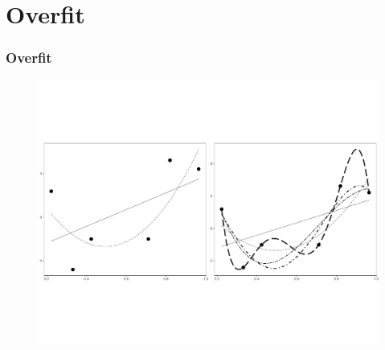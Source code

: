 \documentclass[
  shownotes,
  xcolor={svgnames},
  hyperref={colorlinks,citecolor=DarkBlue,linkcolor=DarkRed,urlcolor=DarkBlue}
  ]{beamer}
\begin{document}
\section{Overfit}
\begin{frame}[fragile]
\frametitle{Overfit}


        \begin{figure}[H] \centering
            \captionsetup{justification=centering}
              \includegraphics[scale=0.4]{figures/fig_1a.pdf}
 \end{figure}


\end{frame}
\end{document}
